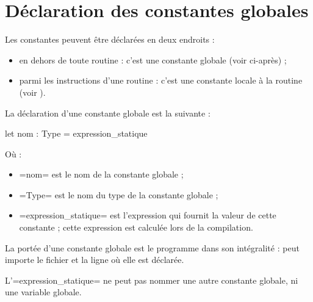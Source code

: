 




\chapter{Déclaration des constantes globales}

Les constantes peuvent être déclarées en deux endroits :
\begin{itemize}
  \item en dehors de toute routine : c'est une constante globale (voir ci-après) ;
  \item parmi les instructions d'une routine : c'est une constante locale à la routine (voir ).
\end{itemize}





La déclaration d'une constante globale est la suivante :

\begin{PLM}
let nom : Type = expression_statique
\end{PLM}

Où :
\begin{itemize}
  \item \plm=nom= est le nom de la constante globale ;
  \item \plm=Type= est le nom du type de la constante globale ;
  \item \plm=expression_statique= est l'expression qui fournit la valeur de cette constante ; cette expression est calculée lors de la compilation.
\end{itemize}

La portée d'une constante globale est le programme dans son intégralité : peut importe le fichier et la ligne où elle est déclarée.

L'\plm=expression_statique= ne peut pas nommer une autre constante globale, ni une variable globale. 

